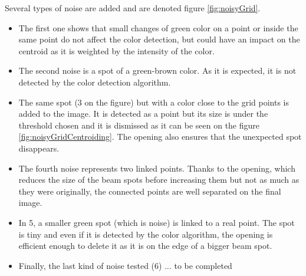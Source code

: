 Several types of noise are added and are denoted figure \ref{fig:noisyGrid}. 
\begin{itemize}
\item The first one shows that small changes of green color on a point or inside the same point do not affect the color detection, but could have an impact on the centroid as it is weighted by the intensity of the color. 
\item The second noise is a spot of a green-brown color. As it is expected, it is not detected by the color detection algorithm. 
\item The same spot (3 on the figure) but with a color close to the grid points is added to the image. It is detected as a point but its size is under the threshold chosen and it is dismissed as it can be seen on the figure \ref{fig:noisyGridCentroiding}. The opening also ensures that the unexpected spot disappears. 
\item The fourth noise represents two linked points. Thanks to the opening, which reduces the size of the beam spots before increasing them but not as much as they were originally, the connected points are well separated on the final image.
\item In 5, a smaller green spot (which is noise) is linked to a real point. The spot is tiny and even if it is detected by the color algorithm, the opening is efficient enough to delete it as it is on the edge of a bigger beam spot.
\item Finally, the last kind of noise tested (6)  ... to be completed
\end{itemize}

